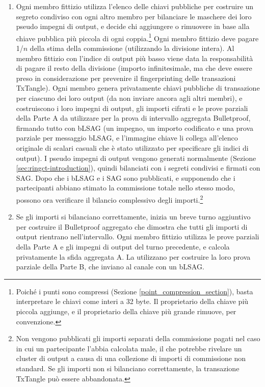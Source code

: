 \begin{enumerate}
    \item Ogni membro fittizio utilizza l'elenco delle chiavi pubbliche per costruire un segreto condiviso con ogni altro membro per bilanciare le maschere dei loro pseudo impegni di output, e decide chi aggiungere o rimuovere in base alla chiave pubblica più piccola di ogni coppia.\footnote{Poiché i punti sono compressi (Sezione \ref{point_compression_section}), basta interpretare le chiavi come interi a 32 byte. Il proprietario della chiave più piccola aggiunge, e il proprietario della chiave più grande rimuove, per convenzione.} Ogni membro fittizio deve pagare 1/$n$ della stima della commissione (utilizzando la divisione intera). Al membro fittizio con l'indice di output più basso viene data la responsabilità di pagare il resto della divisione (importo infinitesimale, ma che deve essere preso in considerazione per prevenire il fingerprinting delle transazioni TxTangle). Ogni membro genera privatamente chiavi pubbliche di transazione per ciascuno dei loro output (da non inviare ancora agli altri membri), e costruiscono i loro impegni di output, gli importi cifrati e le prove parziali della Parte A da utilizzare per la prova di intervallo aggregata Bulletproof, firmando tutto con bLSAG (un impegno, un importo codificato e una prova parziale per messaggio bLSAG, e l'immagine chiave li collega all'elenco originale di scalari casuali che è stato utilizzato per specificare gli indici di output). I pseudo impegni di output vengono generati normalmente (Sezione \ref{sec:ringct-introduction}), quindi bilanciati con i segreti condivisi e firmati con SAG. Dopo che i bLSAG e i SAG sono pubblicati, e supponendo che i partecipanti abbiano stimato la commissione totale nello stesso modo, possono ora verificare il bilancio complessivo degli importi.\footnote{Non vengono pubblicati gli importi separati della commissione pagati nel caso in cui un partecipante l'abbia calcolata male, il che potrebbe rivelare un cluster di output a causa di una collezione di importi di commissione non standard. Se gli importi non si bilanciano correttamente, la transazione TxTangle può essere abbandonata.}
    \item Se gli importi si bilanciano correttamente, inizia un breve turno aggiuntivo per costruire il Bulletproof aggregato che dimostra che tutti gli importi di output rientrano nell'intervallo. Ogni membro fittizio utilizza le prove parziali della Parte A e gli impegni di output del turno precedente, e calcola privatamente la sfida aggregata A. La utilizzano per costruire la loro prova parziale della Parte B, che inviano al canale con un bLSAG.

\end{enumerate}
